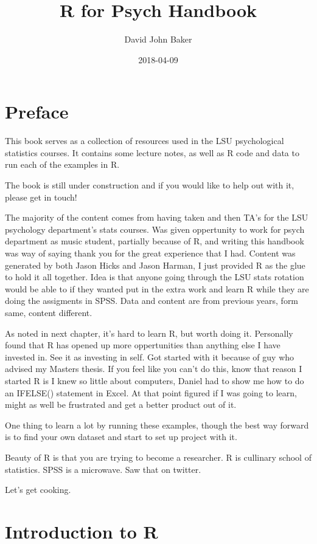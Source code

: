 \documentclass[]{book}
\title{R for Psych Handbook}
\author{David John Baker}
\date{2018-04-09}
\theoremstyle{definition}
\theoremstyle{definition}
\theoremstyle{definition}
\theoremstyle{remark}
\begin{document}
\maketitle

{
\setcounter{tocdepth}{1}
\tableofcontents
}
\chapter{Preface}\label{preface}

This book serves as a collection of resources used in the LSU
psychological statistics courses. It contains some lecture notes, as
well as R code and data to run each of the examples in R.

The book is still under construction and if you would like to help out
with it, please get in touch!

The majority of the content comes from having taken and then TA's for
the LSU psychology department's stats courses. Was given oppertunity to
work for psych department as music student, partially because of R, and
writing this handbook was way of saying thank you for the great
experience that I had. Content was generated by both Jason Hicks and
Jason Harman, I just provided R as the glue to hold it all together.
Idea is that anyone going through the LSU stats rotation would be able
to if they wanted put in the extra work and learn R while they are doing
the assigments in SPSS. Data and content are from previous years, form
same, content different.

As noted in next chapter, it's hard to learn R, but worth doing it.
Personally found that R has opened up more oppertunities than anything
else I have invested in. See it as investing in self. Got started with
it because of guy who advised my Masters thesis. If you feel like you
can't do this, know that reason I started R is I knew so little about
computers, Daniel had to show me how to do an IFELSE() statement in
Excel. At that point figured if I was going to learn, might as well be
frustrated and get a better product out of it.

One thing to learn a lot by running these examples, though the best way
forward is to find your own dataset and start to set up project with it.

Beauty of R is that you are trying to become a researcher. R is
cullinary school of statistics. SPSS is a microwave. Saw that on
twitter.

Let's get cooking.

\chapter{Introduction to R}\label{intro}
\end{document}

